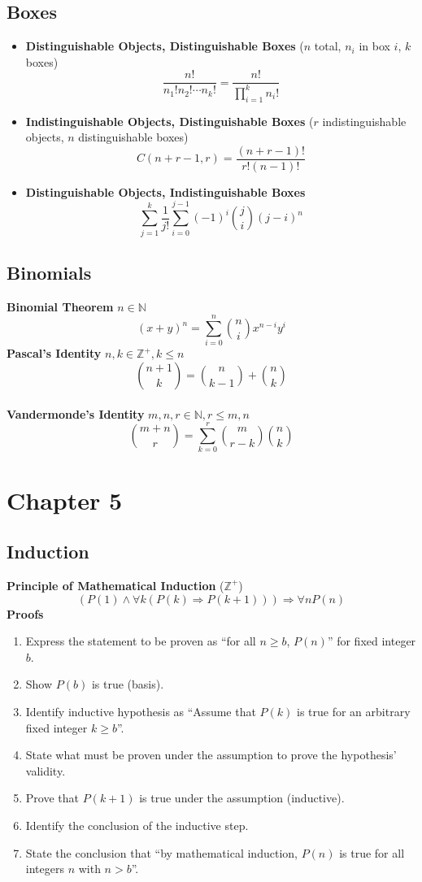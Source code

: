 \documentclass[12pt, A4, twocolumn]{article}
\newcommand{\N}{\mathbb{N}}
\newcommand{\Z}{\mathbb{Z}}
\begin{document}
		\subsection*{Boxes}
			\begin{itemize}
				\item
					\textbf{Distinguishable Objects, Distinguishable Boxes}
						(\(n\) total, \(n_i\) in box \(i\), \(k\) boxes)
						\[\frac{n!}{n_1!n_2!\cdots n_k!} = \frac{n!}{\prod\limits_{i = 1}^k n_i!}\]
				\item
					\textbf{Indistinguishable Objects, Distinguishable Boxes}
						(\(r\) indistinguishable objects, \(n\) distinguishable boxes)
						\[C(n + r - 1, r) = \frac{(n + r - 1)!}{r!(n - 1)!}\]
				\item
					\textbf{Distinguishable Objects, Indistinguishable Boxes}
						\[\sum_{j = 1}^k \frac{1}{j!} \sum_{i = 0}^{j - 1} (-1)^i\binom{j}{i}(j - i)^n\]
			\end{itemize}
		\subsection*{Binomials}
			\textbf{Binomial Theorem}
			\(n \in \N\)
				\[(x + y)^n = \sum_{i = 0}^n \binom{n}{i} x^{n - i}y^i\]
			\textbf{Pascal's Identity}
				\(n, k \in \Z^+, k \le n\)
				\[\binom{n + 1}{k} = \binom{n}{k - 1} + \binom{n}{k}\] \\
			\textbf{Vandermonde's Identity}
				\(m, n, r \in \N, r \le m, n\)
				\[\binom{m + n}{r} = \sum_{k = 0}^r \binom{m}{r - k}\binom{n}{k}\]
	\section*{Chapter 5}
		\subsection*{Induction}
			\textbf{Principle of Mathematical Induction} (\(\Z^+\))
				\[(P(1) \land \forall k(P(k) \Rightarrow P(k + 1))) \Rightarrow \forall n P(n)\]
			\textbf{Proofs}
				\begin{enumerate}
					\item
						Express the statement to be proven as \enquote{for all \(n \ge b\), \(P(n)\)} for fixed integer \(b\).
					\item
						Show \(P(b)\) is true (basis).
					\item
						Identify inductive hypothesis as \enquote{Assume that \(P(k)\) is true for an arbitrary fixed integer \(k \ge b\)}.
					\item
						State what must be proven under the assumption to prove the hypothesis' validity.
					\item
						Prove that \(P(k + 1)\) is true under the assumption (inductive).
					\item
						Identify the conclusion of the inductive step.
					\item
						State the conclusion that \enquote{by mathematical induction, \(P(n)\) is true for all integers \(n\) with \(n > b\)}.
				\end{enumerate}
\end{document}
